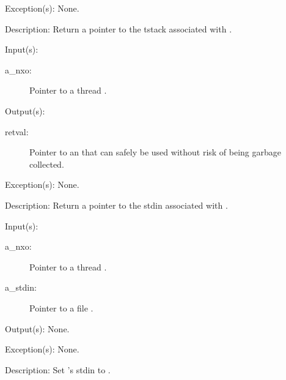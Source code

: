 \begin{capi}
\begin{capilist}
	\item[Exception(s): ] None.
	\item[Description: ]
		Return a pointer to the tstack associated with .
	\end{capilist}
\label{nxo_thread_stdin_get}
	\begin{capilist}
	\item[Input(s): ]
		\begin{description}\item[]
		\item[a\_nxo: ]
			Pointer to a thread .
		\end{description}
	\item[Output(s): ]
		\begin{description}\item[]
		\item[retval: ]
			Pointer to an  that can safely be used
			without risk of being garbage collected.
		\end{description}
	\item[Exception(s): ] None.
	\item[Description: ]
		Return a pointer to the stdin associated with .
	\end{capilist}
\label{nxo_thread_stdin_set}
	\begin{capilist}
	\item[Input(s): ]
		\begin{description}\item[]
		\item[a\_nxo: ]
			Pointer to a thread \classname{nxo}.
		\item[a\_stdin: ]
			Pointer to a file \classname{nxo}.
		\end{description}
	\item[Output(s): ] None.
	\item[Exception(s): ] None.
	\item[Description: ]
		Set 's stdin to \cvar{a\_stdin}.
	\end{capilist}
\label{nxo_thread_stdout_get}
	\begin{capilist}

\end{capilist}
\end{capi}
